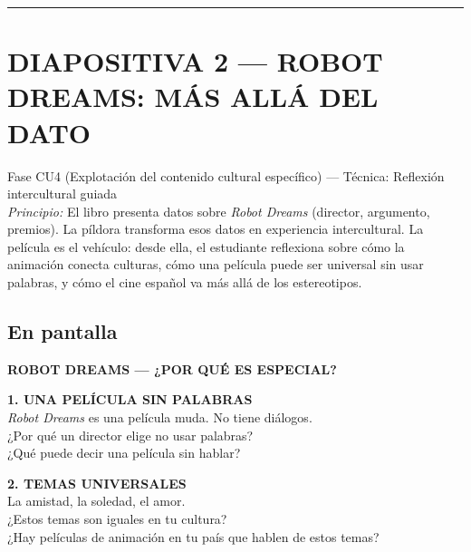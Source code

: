 \documentclass[a4paper,11pt]{article}
\begin{document}
\newpage


\noindent\textcolor{violeta}{\rule{\linewidth}{2.5pt}}

\section*{DIAPOSITIVA 2 — ROBOT DREAMS: MÁS ALLÁ DEL DATO}

{\small Fase CU4 (Explotación del contenido cultural específico) — Técnica: Reflexión intercultural guiada}\\
{\small\textit{Principio:} El libro presenta datos sobre \textit{Robot Dreams} (director, argumento, premios). La píldora transforma esos datos en experiencia intercultural. La película es el vehículo: desde ella, el estudiante reflexiona sobre cómo la animación conecta culturas, cómo una película puede ser universal sin usar palabras, y cómo el cine español va más allá de los estereotipos.}

\vspace{0.5cm}

\subsection*{En pantalla}

\begin{center}
{\Large\textbf{ROBOT DREAMS — ¿POR QUÉ ES ESPECIAL?}}
\end{center}

\vspace{0.5cm}

\noindent\colorbox{violeta!10}{\parbox{\dimexpr\linewidth-2\fboxsep}{%
\textbf{\textcolor{violeta}{1. UNA PELÍCULA SIN PALABRAS}}\\[0.2cm]
\textit{Robot Dreams} es una película muda. No tiene diálogos.\\[0.1cm]
¿Por qué un director elige no usar palabras?\\
¿Qué puede decir una película sin hablar?
}}

\vspace{0.4cm}

\noindent\colorbox{azulg!10}{\parbox{\dimexpr\linewidth-2\fboxsep}{%
\textbf{\textcolor{azulg}{2. TEMAS UNIVERSALES}}\\[0.2cm]
La amistad, la soledad, el amor.\\[0.1cm]
¿Estos temas son iguales en tu cultura?\\
¿Hay películas de animación en tu país que hablen de estos temas?
}}
\end{document}
